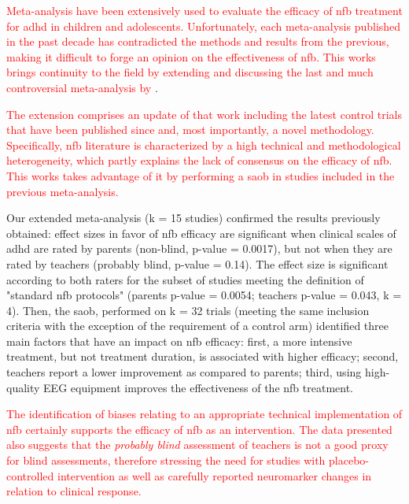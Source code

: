 

\textcolor{red}{\noindent Meta-analysis have been extensively used to
evaluate the efficacy of \gls{nfb} treatment for \gls{adhd} in children and adolescents. 
Unfortunately, each meta-analysis published in the past decade has contradicted the methods and
results from the previous, making it difficult to forge an opinion
on the effectiveness of \gls{nfb}. This works brings continuity to the field by extending and discussing the last and much 
controversial meta-analysis by} \citet{Cortese2016}. 

\textcolor{red}{The extension comprises an update of that work including the latest control trials 
that have been published since and, most importantly, a
novel methodology. Specifically, \gls{nfb} literature is characterized 
by a high technical and methodological heterogeneity, which partly explains the lack of consensus on 
the efficacy of \gls{nfb}. This works takes advantage of it by performing a \gls{saob} in studies included in the previous meta-analysis.}

Our extended meta-analysis (k = 15 studies) confirmed the results previously
obtained: effect sizes in favor of \gls{nfb} efficacy are significant when clinical scales of \gls{adhd}
are rated by parents (non-blind, p-value = 0.0017), but not when they are rated by
teachers (probably blind, p-value = 0.14). The effect size is significant
according to both raters for the subset of studies meeting the definition of
"standard \gls{nfb} protocols" (parents p-value = 0.0054; teachers p-value = 0.043, k
= 4). Then, the \gls{saob}, performed on k = 32 trials (meeting the same inclusion
criteria with the exception of the requirement of a control arm)
identified three main factors that have an impact on \gls{nfb} efficacy: first, a more
intensive treatment, but not treatment duration, is associated with higher
efficacy; second, teachers report a lower improvement as compared to parents;
third, using high-quality EEG equipment improves the effectiveness of the \gls{nfb} treatment.

\textcolor{red}{The identification of biases relating to an appropriate technical implementation of \gls{nfb} 
certainly supports the efficacy of \gls{nfb} as an
intervention. The data presented also suggests that the \emph{probably blind} assessment of teachers is
not a good proxy for blind assessments, therefore stressing the need for studies with placebo-controlled
intervention as well as carefully reported neuromarker changes in relation to
clinical response.}



